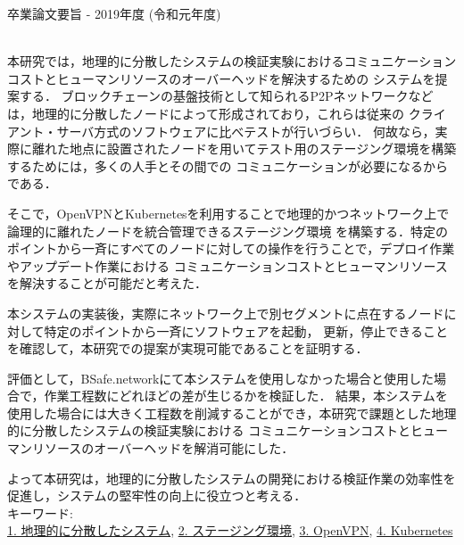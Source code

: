 卒業論文要旨 - 2019年度 (令和元年度)
\begin{center}
\begin{large}
\end{large}
\end{center}

~ \\
本研究では，地理的に分散したシステムの検証実験におけるコミュニケーションコストとヒューマンリソースのオーバーヘッドを解決するための
システムを提案する．
ブロックチェーンの基盤技術として知られるP2Pネットワークなどは，地理的に分散したノードによって形成されており，これらは従来の
クライアント・サーバ方式のソフトウェアに比べテストが行いづらい．
何故なら，実際に離れた地点に設置されたノードを用いてテスト用のステージング環境を構築するためには，多くの人手とその間での
コミュニケーションが必要になるからである．

そこで，OpenVPNとKubernetesを利用することで地理的かつネットワーク上で論理的に離れたノードを統合管理できるステージング環境
を構築する．特定のポイントから一斉にすべてのノードに対しての操作を行うことで，デプロイ作業やアップデート作業における
コミュニケーションコストとヒューマンリソースを解決することが可能だと考えた．

本システムの実装後，実際にネットワーク上で別セグメントに点在するノードに対して特定のポイントから一斉にソフトウェアを起動，
更新，停止できることを確認して，本研究での提案が実現可能であることを証明する．

評価として，BSafe.networkにて本システムを使用しなかった場合と使用した場合で，作業工程数にどれほどの差が生じるかを検証した．
結果，本システムを使用した場合には大きく工程数を削減することができ，本研究で課題とした地理的に分散したシステムの検証実験における
コミュニケーションコストとヒューマンリソースのオーバーヘッドを解消可能にした．

よって本研究は，地理的に分散したシステムの開発における検証作業の効率性を促進し，システムの堅牢性の向上に役立つと考える．
~ \\
キーワード:\\
\underline{1. 地理的に分散したシステム},
\underline{2. ステージング環境},
\underline{3. OpenVPN},
\underline{4. Kubernetes}
\begin{flushright}
\dept \\
\author
\end{flushright}
